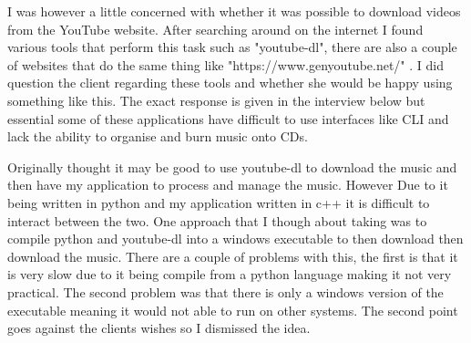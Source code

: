 \documentclass{article}
\begin{document}
I was however a little concerned with whether it was possible to download
videos from the YouTube website. After searching around on the internet
I found various tools that perform this task such as "youtube-dl", there
are also a couple of websites that do the same thing like "https://www.genyoutube.net/"
. I did question the client regarding these tools and whether she would
be happy using something like this. The exact response is given in the interview
below but essential some of these applications have difficult to use interfaces
like CLI and lack the ability to organise and burn music onto CDs.

Originally thought it may be good to use youtube-dl to download the music
and then have my application to process and manage the music. However Due to it being written in python
and my application written in c++
it is difficult to interact between the two. One approach that I though about taking was to compile
python and youtube-dl into a windows executable to then download then download the music. There are a couple of problems with this, the
first is that it is very slow due to it being compile from a python language making it not very practical.
The second problem was that there is only a windows version of the executable meaning it would not
able to run on other systems. The second point goes against the clients wishes so
I dismissed the idea.
\end{document}
